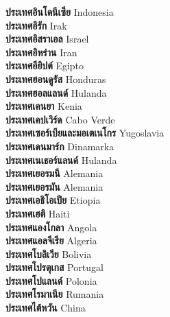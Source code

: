 \textbf{ ประเทศอินโดนีเซีย  } Indonesia \\
\textbf{ ประเทศอิรัก  } Irak \\
\textbf{ ประเทศอิสราเอล  } Israel \\
\textbf{ ประเทศอิหร่าน  } Iran \\
\textbf{ ประเทศอียิปต์  } Egipto \\
\textbf{ ประเทศฮอนดูรัส  } Honduras \\
\textbf{ ประเทศฮอลแลนด์  } Hulanda \\
\textbf{ ประเทศเคนยา  } Kenia \\
\textbf{ ประเทศเคปเวิร์ด  } Cabo Verde \\
\textbf{ ประเทศเซอร์เบียและมอเตเนโกร  } Yugoslavia \\
\textbf{ ประเทศเดนมาร์ก  } Dinamarka \\
\textbf{ ประเทศเนเธอร์แลนด์  } Hulanda \\
\textbf{ ประเทศเยอรมนี  } Alemania \\
\textbf{ ประเทศเยอรมัน  } Alemania \\
\textbf{ ประเทศเอธิโอเปีย  } Etiopia \\
\textbf{ ประเทศเฮติ  } Haiti \\
\textbf{ ประเทศแองโกลา  } Angola \\
\textbf{ ประเทศแอลจีเรีย  } Algeria \\
\textbf{ ประเทศโบลิเวีย  } Bolivia \\
\textbf{ ประเทศโปรตุเกส  } Portugal \\
\textbf{ ประเทศโปแลนด์  } Polonia \\
\textbf{ ประเทศโรมาเนีย  } Rumania \\
\textbf{ ประเทศไต้หวัน  } China \\
